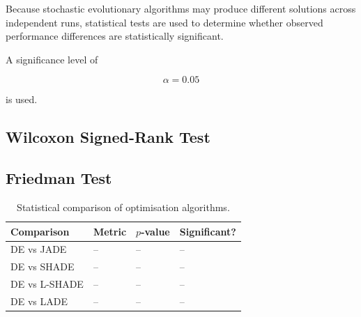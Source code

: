 \documentclass[review]{elsarticle}
\begin{document}
Because stochastic evolutionary algorithms may produce different
solutions across independent runs, statistical tests are used to
determine whether observed performance differences are statistically
significant.

A significance level of

\begin{equation}
\alpha = 0.05
\end{equation}

is used.


\subsection{Wilcoxon Signed-Rank Test}

%
%


\subsection{Friedman Test}

%


\begin{table}[H]
\caption{Statistical comparison of optimisation algorithms.}
\label{tab:stats}
\centering

\begin{tabular}{llll}
\toprule
Comparison & Metric & $p$-value & Significant? \\
\midrule

DE vs JADE      & -- & -- & -- \\
DE vs SHADE     & -- & -- & -- \\
DE vs L-SHADE   & -- & -- & -- \\
DE vs LADE      & -- & -- & -- \\

\bottomrule
\end{tabular}

\end{table}


\end{document}
